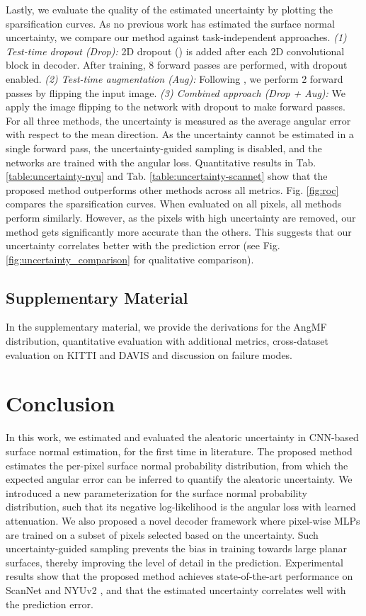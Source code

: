 \documentclass[10pt,twocolumn,letterpaper]{article}
\begin{document}
Lastly, we evaluate the quality of the estimated uncertainty by plotting the sparsification curves. As no previous work has estimated the surface normal uncertainty, we compare our method against task-independent approaches. \textit{(1) Test-time dropout (Drop):} 2D dropout () is added after each 2D convolutional block in decoder. After training, 8 forward passes are performed, with dropout enabled. \textit{(2) Test-time augmentation (Aug):} Following \cite{on_the_uncertainty}, we perform 2 forward passes by flipping the input image. \textit{(3) Combined approach (Drop + Aug):} We apply the image flipping to the network with dropout to make  forward passes. For all three methods, the uncertainty is measured as the average angular error with respect to the mean direction. As the uncertainty cannot be estimated in a single forward pass, the uncertainty-guided sampling is disabled, and the networks are trained with the angular loss. Quantitative results in Tab. \ref{table:uncertainty-nyu} and Tab. \ref{table:uncertainty-scannet} show that the proposed method outperforms other methods across all metrics. Fig. \ref{fig:roc} compares the sparsification curves. When evaluated on all pixels, all methods perform similarly. However, as the pixels with high uncertainty are removed, our method gets significantly more accurate than the others. This suggests that our uncertainty correlates better with the prediction error (see Fig. \ref{fig:uncertainty_comparison} for qualitative comparison).  

\subsection{Supplementary Material}

In the supplementary material, we provide the derivations for the AngMF distribution, quantitative evaluation with additional metrics, cross-dataset evaluation on KITTI \cite{KITTI} and DAVIS \cite{DAVIS} and discussion on failure modes.

\section{Conclusion}

In this work, we estimated and evaluated the aleatoric uncertainty in CNN-based surface normal estimation, for the first time in literature. The proposed method estimates the per-pixel surface normal probability distribution, from which the expected angular error can be inferred to quantify the aleatoric uncertainty. We introduced a new parameterization for the surface normal probability distribution, such that its negative log-likelihood is the angular loss with learned attenuation. We also proposed a novel decoder framework where pixel-wise MLPs are trained on a subset of pixels selected based on the uncertainty. Such uncertainty-guided sampling prevents the bias in training towards large planar surfaces, thereby improving the level of detail in the prediction. Experimental results show that the proposed method achieves state-of-the-art performance on ScanNet \cite{ScanNet} and NYUv2 \cite{NYUv2}, and that the estimated uncertainty correlates well with the prediction error.
\end{document}
